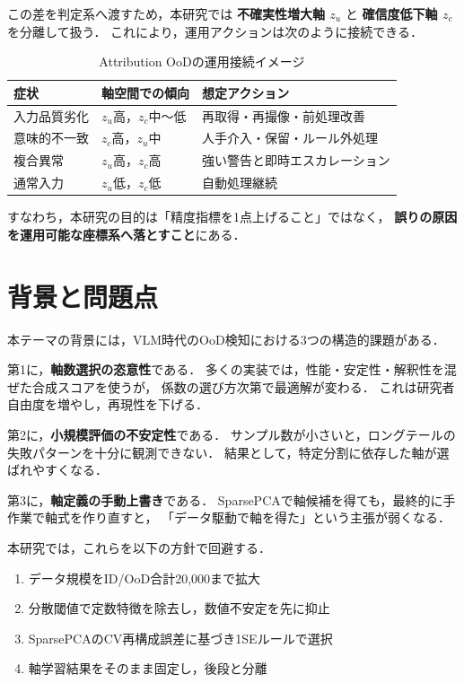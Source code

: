 \documentclass[11pt,a4paper]{article}
\begin{document}
この差を判定系へ渡すため，本研究では
\textbf{不確実性増大軸 $z_u$} と
\textbf{確信度低下軸 $z_c$} を分離して扱う．
これにより，運用アクションは次のように接続できる．

\begin{table}[H]
\centering
\begin{tabular}{lll}
\toprule
症状 & 軸空間での傾向 & 想定アクション \\
\midrule
入力品質劣化 & $z_u$高，$z_c$中〜低 & 再取得・再撮像・前処理改善 \\
意味的不一致 & $z_c$高，$z_u$中 & 人手介入・保留・ルール外処理 \\
複合異常 & $z_u$高，$z_c$高 & 強い警告と即時エスカレーション \\
通常入力 & $z_u$低，$z_c$低 & 自動処理継続 \\
\bottomrule
\end{tabular}
\caption{Attribution OoDの運用接続イメージ}
\label{tab:ops}
\end{table}

すなわち，本研究の目的は「精度指標を1点上げること」ではなく，
\textbf{誤りの原因を運用可能な座標系へ落とすこと}にある．

\section{背景と問題点}
本テーマの背景には，VLM時代のOoD検知における3つの構造的課題がある．

第1に，\textbf{軸数選択の恣意性}である．
多くの実装では，性能・安定性・解釈性を混ぜた合成スコアを使うが，
係数の選び方次第で最適解が変わる．
これは研究者自由度を増やし，再現性を下げる．

第2に，\textbf{小規模評価の不安定性}である．
サンプル数が小さいと，ロングテールの失敗パターンを十分に観測できない．
結果として，特定分割に依存した軸が選ばれやすくなる．

第3に，\textbf{軸定義の手動上書き}である．
SparsePCAで軸候補を得ても，最終的に手作業で軸式を作り直すと，
「データ駆動で軸を得た」という主張が弱くなる．

本研究では，これらを以下の方針で回避する．
\begin{enumerate}
  \item データ規模をID/OoD合計20,000まで拡大
  \item 分散閾値で定数特徴を除去し，数値不安定を先に抑止
  \item SparsePCAのCV再構成誤差に基づき1SEルールで選択
  \item 軸学習結果をそのまま固定し，後段と分離
\end{enumerate}
\end{document}
